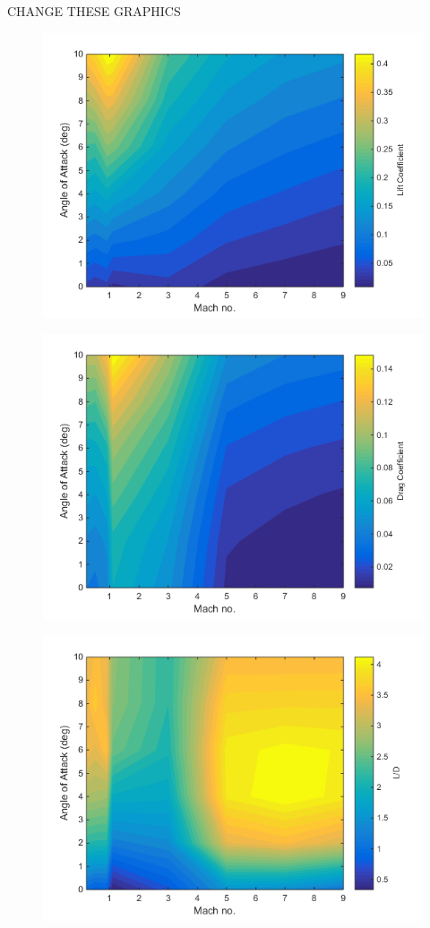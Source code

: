CHANGE THESE GRAPHICS
\begin{figure}
\centering
\includegraphics[width=0.7\linewidth]{figures/3_vehicle_design/Cl}
\caption{}
\label{fig:Cl}
\end{figure}
\begin{figure}
\centering
\includegraphics[width=0.7\linewidth]{figures/3_vehicle_design/Cd}
\caption{}
\label{fig:Cd}
\end{figure}
\begin{figure}
\centering
\includegraphics[width=0.7\linewidth]{figures/3_vehicle_design/LD}
\caption{}
\label{fig:LD}
\end{figure}

